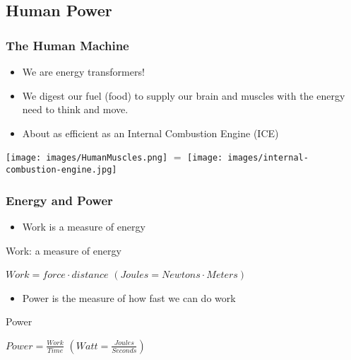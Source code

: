 \documentclass[]{beamer}
\begin{document}
\subsection{Human Power}
%
\frame
{
  \frametitle{The Human Machine}
  \begin{itemize}
    \item<1-> We are energy transformers!
    \item<2-> We digest our fuel (food) to supply our brain and muscles
      with the energy need to think and move.
    \item<3-> About as efficient as an Internal Combustion Engine (ICE)
  \end{itemize}
  \begin{center}
    \texttt{[image: images/HumanMuscles.png]}
    \Large{$=$}
    \texttt{[image: images/internal-combustion-engine.jpg]}
  \end{center}
}
%
\frame
{
  \frametitle{Energy and Power}
  \begin{itemize}
    \item<1-> Work is a measure of energy
  \end{itemize}
\begin{beamerboxesrounded}[upper=uppercol,lower=lowercol,shadow=true]{Work:
    a measure of energy}
  \begin{center}
      $Work = force \cdot distance$ $(Joules=Newtons\cdot Meters)$ 
  \end{center}
\end{beamerboxesrounded}
  \begin{itemize}
    \item<2-> Power is the measure of how fast we can do work
  \end{itemize}
\begin{beamerboxesrounded}[upper=uppercol,lower=lowercol,shadow=true]{Power}
  \begin{center}
      $Power=\frac{Work}{Time}$ $(Watt = \frac{Joules}{Seconds})$
    \end{center}
\end{beamerboxesrounded}
}
\end{document}
